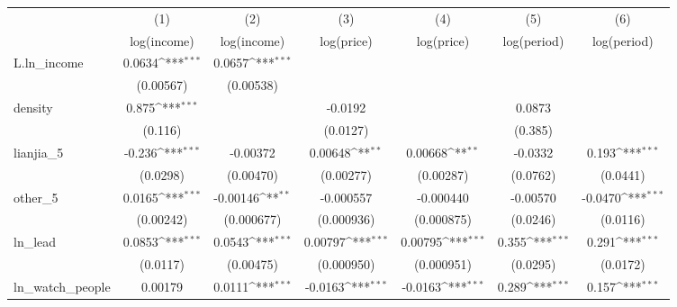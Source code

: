 {
\def\sym#1{\ifmmode^{#1}\else\(^{#1}\)\fi}
\begin{tabular}{l*{6}{c}}
\toprule
            &\multicolumn{1}{c}{(1)}&\multicolumn{1}{c}{(2)}&\multicolumn{1}{c}{(3)}&\multicolumn{1}{c}{(4)}&\multicolumn{1}{c}{(5)}&\multicolumn{1}{c}{(6)}\\
            &\multicolumn{1}{c}{log(income)}&\multicolumn{1}{c}{log(income)}&\multicolumn{1}{c}{log(price)}&\multicolumn{1}{c}{log(price)}&\multicolumn{1}{c}{log(period)}&\multicolumn{1}{c}{log(period)}\\
\midrule
L.ln\_income &      0.0634\sym{***}&      0.0657\sym{***}&                     &                     &                     &                     \\
            &   (0.00567)         &   (0.00538)         &                     &                     &                     &                     \\
\addlinespace
density     &       0.875\sym{***}&                     &     -0.0192         &                     &      0.0873         &                     \\
            &     (0.116)         &                     &    (0.0127)         &                     &     (0.385)         &                     \\
\addlinespace
lianjia\_5   &      -0.236\sym{***}&    -0.00372         &     0.00648\sym{**} &     0.00668\sym{**} &     -0.0332         &       0.193\sym{***}\\
            &    (0.0298)         &   (0.00470)         &   (0.00277)         &   (0.00287)         &    (0.0762)         &    (0.0441)         \\
\addlinespace
other\_5     &      0.0165\sym{***}&    -0.00146\sym{**} &   -0.000557         &   -0.000440         &    -0.00570         &     -0.0470\sym{***}\\
            &   (0.00242)         &  (0.000677)         &  (0.000936)         &  (0.000875)         &    (0.0246)         &    (0.0116)         \\
\addlinespace
ln\_lead     &      0.0853\sym{***}&      0.0543\sym{***}&     0.00797\sym{***}&     0.00795\sym{***}&       0.355\sym{***}&       0.291\sym{***}\\
            &    (0.0117)         &   (0.00475)         &  (0.000950)         &  (0.000951)         &    (0.0295)         &    (0.0172)         \\
\addlinespace
ln\_watch\_people&     0.00179         &      0.0111\sym{***}&     -0.0163\sym{***}&     -0.0163\sym{***}&       0.289\sym{***}&       0.157\sym{***}\\

\end{tabular}}
